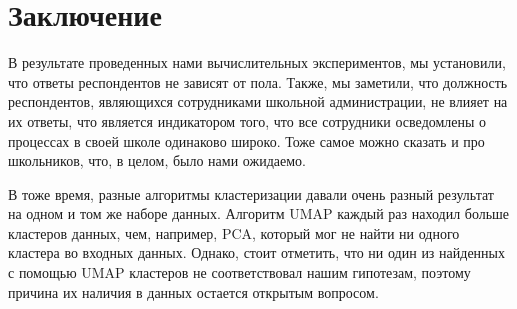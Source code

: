 \section{Заключение}

В результате проведенных нами вычислительных экспериментов, мы установили, что ответы респондентов не зависят от пола.
Также, мы заметили, что должность респондентов, являющихся сотрудниками школьной администрации, не влияет на их ответы, что является индикатором того, что все сотрудники осведомлены о процессах в своей школе одинаково широко.
Тоже самое можно сказать и про школьников, что, в целом, было нами ожидаемо.

В тоже время, разные алгоритмы кластеризации давали очень разный результат на одном и том же наборе данных.
Алгоритм UMAP каждый раз находил больше кластеров данных, чем, например, PCA, который мог не найти ни одного кластера во входных данных.
Однако, стоит отметить, что ни один из найденных с помощью UMAP кластеров не соответствовал нашим гипотезам, поэтому причина их наличия в данных остается открытым вопросом.